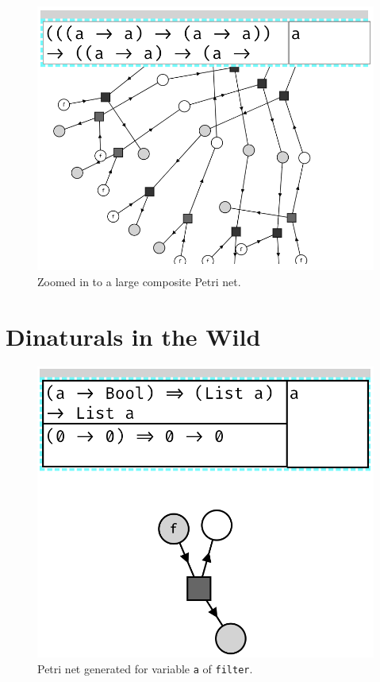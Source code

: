 \documentclass[11pt,openright,hidelinks,a4paper]{article}
\begin{document}
\begin{figure}[H]
\begin{center}
\includegraphics[scale=0.45]{zoomedin}
\end{center}
\caption{Zoomed in to a large composite Petri net.}
\label{fig:zoomedin}
\end{figure}

\section{Dinaturals in the Wild}\label{app:wilddinaturals}

\begin{figure}[H]
\begin{center}
\includegraphics[scale=0.45]{filter}
\end{center}
\caption{Petri net generated for variable \lstinline{a} of \lstinline{filter}.}
\label{fig:filter}
\end{figure}
\end{document}
